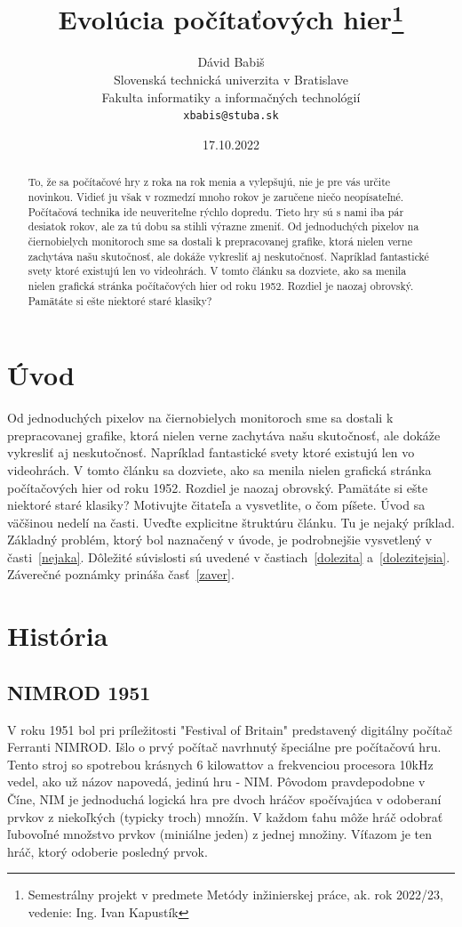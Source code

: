 \documentclass[10pt,twoside,slovak,a4paper]{coursepaper}
\title{Evolúcia počítaťových hier\thanks{Semestrálny projekt v predmete Metódy inžinierskej práce, ak. rok 2022/23, vedenie: Ing. Ivan Kapustík}} %
\author{Dávid Babiš\\[2pt]
	{\small Slovenská technická univerzita v Bratislave}\\
	{\small Fakulta informatiky a informačných technológií}\\
	{\small \texttt{xbabis@stuba.sk}}
	}
\date{\small 17.10.2022} %
\begin{document}
\maketitle

\begin{abstract}
To, že sa počítačové hry z roka na rok menia a vylepšujú, nie je pre vás určite novinkou. Vidieť ju však v rozmedzí mnoho rokov je zaručene niečo neopísateľné. Počítačová technika ide neuveriteľne rýchlo dopredu. Tieto hry sú s nami iba pár desiatok rokov, ale za tú dobu sa stihli výrazne zmeniť. Od jednoduchých pixelov na čiernobielych monitoroch sme sa dostali k prepracovanej grafike, ktorá nielen verne zachytáva našu skutočnosť, ale dokáže vykresliť aj neskutočnosť. Napríklad fantastické svety ktoré existujú len vo videohrách.  V tomto článku sa dozviete, ako sa menila nielen grafická stránka počítačových hier od roku 1952. Rozdiel je naozaj obrovský. Pamätáte si ešte niektoré staré klasiky?
\end{abstract}



\section{Úvod}
 Od jednoduchých pixelov na čiernobielych monitoroch sme sa dostali k prepracovanej grafike, ktorá nielen verne zachytáva našu skutočnosť, ale dokáže vykresliť aj neskutočnosť. Napríklad fantastické svety ktoré existujú len vo videohrách.  V tomto článku sa dozviete, ako sa menila nielen grafická stránka počítačových hier od roku 1952. Rozdiel je naozaj obrovský. Pamätáte si ešte niektoré staré klasiky?
Motivujte čitateľa a vysvetlite, o čom píšete. Úvod sa väčšinou nedelí na časti.
Uveďte explicitne štruktúru článku. Tu je nejaký príklad.
Základný problém, ktorý bol naznačený v úvode, je podrobnejšie vysvetlený v časti~\ref{nejaka}.
Dôležité súvislosti sú uvedené v častiach~\ref{dolezita} a~\ref{dolezitejsia}.
Záverečné poznámky prináša časť~\ref{zaver}.

\section{História}

\subsection{NIMROD 1951}
V roku 1951 bol pri príležitosti "Festival of Britain" predstavený digitálny počítač Ferranti NIMROD. Išlo o prvý počítač navrhnutý špeciálne pre počítačovú hru. Tento stroj so spotrebou krásnych 6 kilowattov a frekvenciou procesora 10kHz vedel, ako už názov napovedá, jedinú hru - NIM. Pôvodom pravdepodobne v Číne, NIM je jednoduchá logická hra pre dvoch hráčov spočívajúca v odoberaní prvkov z niekoľkých (typicky troch) množín. V každom ťahu môže hráč odobrať ľubovoľné množstvo prvkov (miniálne jeden) z jednej množiny. Víťazom je ten hráč, ktorý odoberie posledný prvok.
\end{document}
